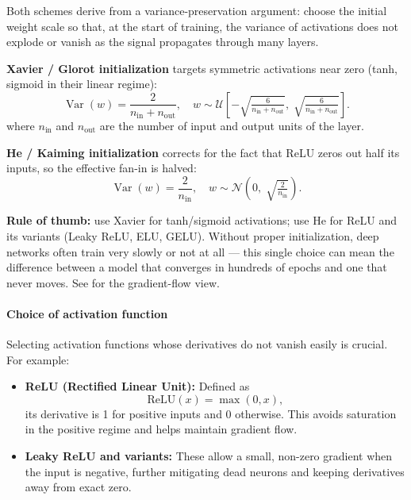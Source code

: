 \begin{tcolorbox}[summarybox, title={Initializing weights: Xavier and He}]
Both schemes derive from a variance-preservation argument: choose the initial weight scale so that, at the start of training, the variance of activations does not explode or vanish as the signal propagates through many layers.

\textbf{Xavier / Glorot initialization} targets symmetric activations near zero (tanh, sigmoid in their linear regime):
\[
  \operatorname{Var}(w) = \frac{2}{n_{\text{in}} + n_{\text{out}}},
  \quad
  w \sim \mathcal{U}\!\left[-\sqrt{\tfrac{6}{n_{\text{in}}+n_{\text{out}}}},\; \sqrt{\tfrac{6}{n_{\text{in}}+n_{\text{out}}}}\right].
\]
where \(n_{\text{in}}\) and \(n_{\text{out}}\) are the number of input and output units of the layer.

\textbf{He / Kaiming initialization} corrects for the fact that ReLU zeros out half its inputs, so the effective fan-in is halved:
\[
  \operatorname{Var}(w) = \frac{2}{n_{\text{in}}},
  \quad
  w \sim \mathcal{N}\!\left(0,\; \sqrt{\tfrac{2}{n_{\text{in}}}}\right).
\]

\textbf{Rule of thumb:} use Xavier for tanh/sigmoid activations; use He for ReLU and its variants (Leaky ReLU, ELU, GELU). Without proper initialization, deep networks often train very slowly or not at all --- this single choice can mean the difference between a model that converges in hundreds of epochs and one that never moves. See  for the gradient-flow view.
\end{tcolorbox}

\paragraph{Choice of activation function}

Selecting activation functions whose derivatives do not vanish easily is crucial. For example:

\begin{itemize}
    \item \textbf{ReLU (Rectified Linear Unit):} Defined as
    \begin{equation}
    \mathrm{ReLU}(x) = \max(0, x),
    \label{eq:cnn_relu_definition}
    \end{equation}
    its derivative is 1 for positive inputs and 0 otherwise. This avoids saturation in the positive regime and helps maintain gradient flow.

    \item \textbf{Leaky ReLU and variants:} These allow a small, non-zero gradient when the input is negative, further mitigating dead neurons and keeping derivatives away from exact zero.
\end{itemize}

